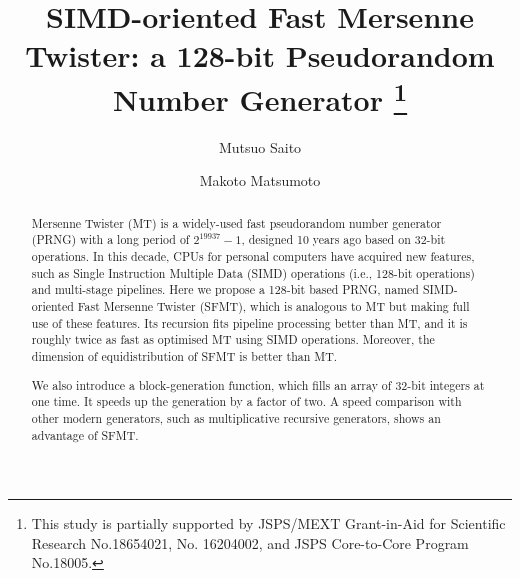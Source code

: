 \documentclass{svmult}
\begin{document}
\title*{SIMD-oriented Fast Mersenne Twister:
a 128-bit Pseudorandom Number Generator
\thanks{This study is partially supported by JSPS/MEXT
Grant-in-Aid for Scientific Research No.18654021, No. 16204002,
and JSPS Core-to-Core Program No.18005.}}
            

\author{Mutsuo Saito\and
Makoto Matsumoto}

\maketitle
            
\begin{abstract} 
Mersenne Twister (MT)
is a widely-used fast pseudorandom number generator (PRNG)
with a long period of $2^{19937}-1$,
designed 10 years ago based on 32-bit operations.
In this decade, CPUs for personal computers
have acquired new features, such as 
Single Instruction Multiple Data (SIMD) operations
(i.e., 128-bit operations) and multi-stage pipelines.
Here we propose a 128-bit based 
PRNG, named SIMD-oriented Fast Mersenne Twister
(SFMT), which is analogous to MT but making full use
of these features. Its recursion fits pipeline processing
better than MT, and it is roughly twice as fast as 
optimised MT using SIMD operations.
Moreover, the dimension of equidistribution of SFMT
is better than MT. 

We also introduce 
a block-generation function, 
which fills an array of 32-bit integers at one time.
It speeds up the generation by a factor of two. 
A speed comparison with other modern generators, 
such as multiplicative recursive generators,
shows an advantage of SFMT.
\end{abstract}
            


\end{document}
